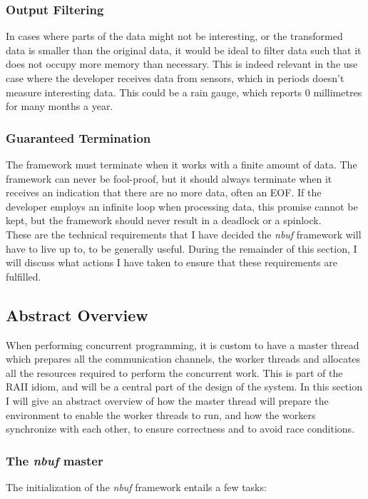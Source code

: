\documentclass[a4paper]{article}
\newcommand{\nbuf}{\textit{nbuf} }
\begin{document}
\subsubsection{Output Filtering}
In cases where parts of the data might not be interesting, or the transformed data is smaller than the original data, it would be ideal to filter data such that it does not occupy more memory than necessary. This is indeed relevant in the use case where the developer receives data from sensors, which in periods doesn't measure interesting data. This could be a rain gauge, which reports 0 millimetres for many months a year.


\subsubsection{Guaranteed Termination}
The framework must terminate when it works with a finite amount of data. The framework can never be fool-proof, but it should always terminate when it receives an indication that there are no more data, often an EOF. If the developer employs an infinite loop when processing data, this promise cannot be kept, but the framework should never result in a deadlock or a spinlock.\\


These are the technical requirements that I have decided the \nbuf framework will have to live up to, to be generally useful. During the remainder of this section, I will discuss what actions I have taken to ensure that these requirements are fulfilled.



\newpage
\subsection{Abstract Overview}
When performing concurrent programming, it is custom to have a master thread which prepares all the communication channels, the worker threads and allocates all the resources required to perform the concurrent work. This is part of the RAII idiom, and will be a central part of the design of the system. In this section I will give an abstract overview of how the master thread will prepare the environment to enable the worker threads to run, and how the workers synchronize with each other, to ensure correctness and to avoid race conditions.


\subsubsection{The \nbuf master}
The initialization of the \nbuf framework entails a few tasks:
\end{document}
